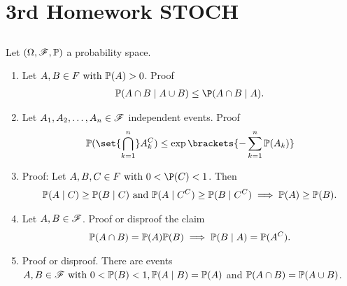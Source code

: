 
\section{3rd Homework STOCH}
\subsection{}
Let $(\Omega, \mathscr{F}, \mathbb{P})$ a probability space.
\begin{enumerate}
	\item Let $A,B \in F \text{ with } \mathbb{P}(A) >0$. Proof
	\begin{align*}
		\meas(A\cap B \mid A\cup B) \le \P(A \cap B \mid A).
	\end{align*}
	\item Let $A_1 , A_2 , \dots , A_n \in \mathscr{F}$ independent events. Proof
	\begin{align*}
		\meas(\set{\bigcap_{k=1}^n} A^C_k) \le \exp\brackets{- \sum_{k=1}^{n} \meas(A_k)}
	\end{align*}
	\item Proof: Let $A,B,C \in F \with 0 < \P(C) < 1$. Then
	\begin{align*}
		\mathbb{P}(A\mid C) \ge \mathbb{P}(B \mid C) \text{ and } \mathbb{P}(A \mid C^C) \ge \mathbb{P}(B \mid C^C) \implies \mathbb{P}(A) \ge \mathbb{P}(B).
	\end{align*}
	\item Let $A, B \in \mathscr{F}$. Proof or disproof the claim
	\begin{align*}
		\mathbb{P}(A\cap B) = \mathbb{P}(A)\mathbb{P}(B) \implies \mathbb{P}(B \mid A) = \mathbb{P}(A^C).
	\end{align*}
	\item Proof or disproof. There are events $A,B \in \mathscr{F} \text{ with } 0 < \mathbb{P}(B) < 1, \mathbb{P}(A\mid B) = \mathbb{P}(A)$ and $\mathbb{P}(A \cap B) = \mathbb{P}(A \cup B)$.
	\begin{align*}
	\end{align*}
\end{enumerate}

